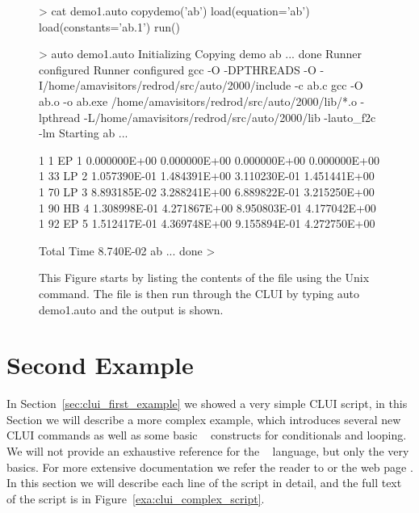 \documentclass[12pt]{report}
\begin{document}
 \begin{figure}[htb]
 {\small \begin{center} \begin{boxedverbatim}
 > cat demo1.auto
 copydemo('ab')
 load(equation='ab')
 load(constants='ab.1')
 run()

 > auto demo1.auto 
 Initializing
 Copying demo ab ... done
 Runner configured
 Runner configured
 gcc -O -DPTHREADS -O -I/home/amavisitors/redrod/src/auto/2000/include -c ab.c
 gcc -O ab.o -o ab.exe /home/amavisitors/redrod/src/auto/2000/lib/*.o  -lpthread 
 -L/home/amavisitors/redrod/src/auto/2000/lib -lauto_f2c -lm
 Starting ab ...

    1     1  EP   1  0.000000E+00  0.000000E+00  0.000000E+00  0.000000E+00
    1    33  LP   2  1.057390E-01  1.484391E+00  3.110230E-01  1.451441E+00
    1    70  LP   3  8.893185E-02  3.288241E+00  6.889822E-01  3.215250E+00
    1    90  HB   4  1.308998E-01  4.271867E+00  8.950803E-01  4.177042E+00
    1    92  EP   5  1.512417E-01  4.369748E+00  9.155894E-01  4.272750E+00

  Total Time    8.740E-02
 ab ... done
 > 
 \end{boxedverbatim}
 \end{center} 
 }
 \caption[Figure of running a simple \AUTO CLUI script.]
 {This Figure starts by listing the contents
 of the  file using the Unix
  command.  The file is then run through
 the \AUTO CLUI by typing {auto demo1.auto} 
 and the output is shown.}
 \label{exa:clui_run_first_script}
 \end{figure}


 \section{ Second Example } \label{sec:clui_complex_example}

 In Section~\ref{sec:clui_first_example} we showed a very simple
 \AUTO CLUI script, in this Section we will describe a more
 complex example, which introduces several new \AUTO CLUI
 commands as well as some basic \python~ constructs for conditionals
 and looping.  We will not provide an exhaustive reference for
 the \python~ language, but only 
 the very basics.  For more extensive documentation we refer the
 reader to  \citeyear{Lut:96} or the
 web page .
 In this section we will describe each line of the script
 in detail, and the full text of the script is in
 Figure~\ref{exa:clui_complex_script}.
\end{document}
